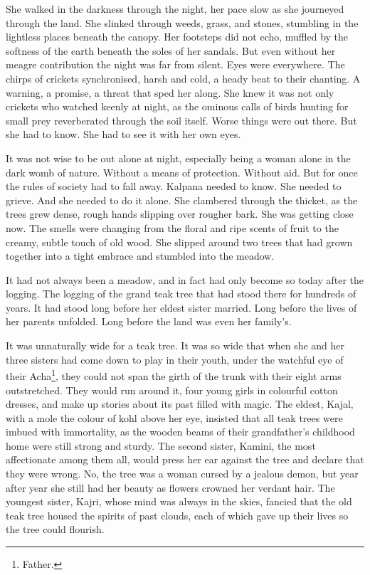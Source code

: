 ﻿She walked in the darkness through the night, her pace slow as she
journeyed through the land. She slinked through weeds, grass, and
stones, stumbling in the lightless places beneath the canopy. Her
footsteps did not echo, muffled by the softness of the earth beneath
the soles of her sandals. But even without her meagre contribution the
night was far from silent. Eyes were everywhere. The chirps of
crickets synchronised, harsh and cold, a heady beat to their
chanting. A warning, a promise, a threat that sped her along. She knew
it was not only crickets who watched keenly at night, as the ominous
calls of birds hunting for small prey reverberated through the soil
itself. Worse things were out there. But she had to know. She had to
see it with her own eyes.

It was not wise to be out alone at night, especially being a woman
alone in the dark womb of nature. Without a means of
protection. Without aid. But for once the rules of society had to fall
away. Kalpana needed to know. She needed to grieve. And she needed to
do it alone.  She clambered through the thicket, as the trees grew
dense, rough hands slipping over rougher bark. She was getting close
now. The smells were changing from the floral and ripe scents of fruit
to the creamy, subtle touch of old wood. She slipped around two trees
that had grown together into a tight embrace and stumbled into the
meadow.

It had not always been a meadow, and in fact had only become so today
after the logging. The logging of the grand teak tree that had stood
there for hundreds of years. It had stood long before her eldest
sister married. Long before the lives of her parents unfolded. Long
before the land was even her family's.

It was unnaturally wide for a teak tree. It was so wide that when she
and her three sisters had come down to play in their youth, under the
watchful eye of their Acha\footnote{Father.}, they could not span the
girth of the trunk with their eight arms outstretched. They would run
around it, four young girls in colourful cotton dresses, and make up
stories about its past filled with magic. The eldest, Kajal, with a
mole the colour of kohl above her eye, insisted that all teak trees
were imbued with immortality, as the wooden beams of their
grandfather's childhood home were still strong and sturdy. The second
sister, Kamini, the most affectionate among them all, would press her
ear against the tree and declare that they were wrong. No, the tree
was a woman cursed by a jealous demon, but year after year she still
had her beauty as flowers crowned her verdant hair. The youngest
sister, Kajri, whose mind was always in the skies, fancied that the
old teak tree housed the spirits of past clouds, each of which gave up
their lives so the tree could flourish.

